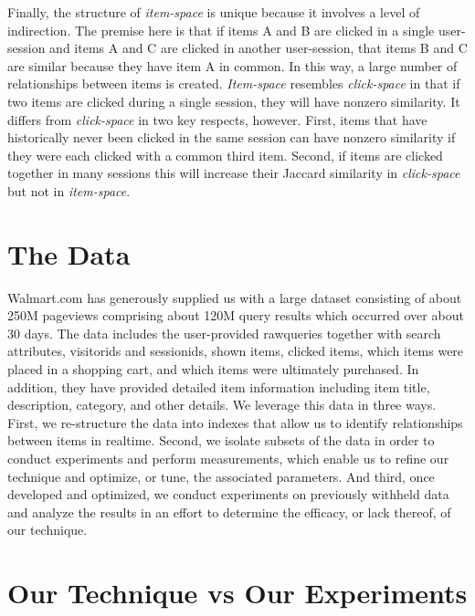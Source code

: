 \documentclass{article}
\begin{document}
Finally, the structure of {\em item-space} is unique because it involves a level
of indirection. The premise here is that if items A and B are clicked in a
single user-session and items A and C are clicked in another user-session, that
items B and C are similar because they have item A in common. In this way, a
large number of relationships between items is created. {\em Item-space}
resembles {\em click-space} in that if two items are clicked during a single
session, they will have nonzero similarity. It differs from {\em click-space} in
two key respects, however. First, items that have historically never been
clicked in the same session can have nonzero similarity if they were each
clicked with a common third item. Second, if items are clicked together in many
sessions this will increase their Jaccard similarity in {\em click-space} but
not in {\em item-space}.

\section{The Data}

Walmart.com has generously supplied us with a large dataset consisting of about
250M pageviews comprising about 120M query results which occurred over about 30
days. The data includes the user-provided rawqueries together with search
attributes, visitorids and sessionids, shown items, clicked items, which items
were placed in a shopping cart, and which items were ultimately purchased. In
addition, they have provided detailed item information including item title,
description, category, and other details. We leverage this data in three ways.
First, we re-structure the data into indexes that allow us to identify
relationships between items in realtime. Second, we isolate subsets of the data
in order to conduct experiments and perform measurements, which enable us to
refine our technique and optimize, or tune, the associated parameters. And
third, once developed and optimized, we conduct experiments on previously
withheld data and analyze the results in an effort to determine the efficacy, or
lack thereof, of our technique. 

\section{Our Technique vs Our Experiments}
\end{document}
